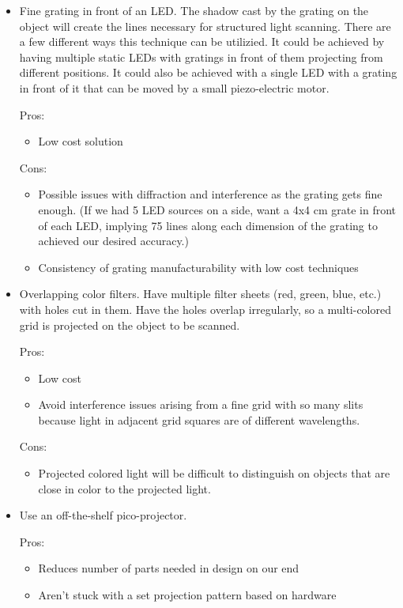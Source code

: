 \documentclass[10pt]{article}
\begin{document}
\begin{itemize}
\item Fine grating in front of an LED. The shadow cast by the grating on the
  object will create the lines necessary for structured light scanning. There are a few different ways this technique can be utilizied. It
  could be achieved by having multiple static LEDs with gratings in front of
  them projecting from different positions.  It could also be achieved with a single LED with a grating in front of it that can be moved by a small piezo-electric motor.
  
  Pros:
  \begin{itemize}
  \item Low cost solution
  \end{itemize}

  Cons:
  \begin{itemize}
  \item Possible issues with diffraction and interference as the grating gets fine enough. (If we had 5 LED sources on a side, want a 4x4 cm grate in front of each LED, implying 75 lines along each dimension of the grating to achieved our desired accuracy.)
  \item Consistency of grating manufacturability with low cost techniques
  \end{itemize}

\item Overlapping color filters. Have multiple filter sheets (red, green, blue, etc.) with holes cut in them. Have the holes overlap irregularly, so a multi-colored grid is projected on the object to be scanned.

Pros:
\begin{itemize}
\item Low cost
\item Avoid interference issues arising from a fine grid with so many slits because light in adjacent grid squares are of different wavelengths.
\end{itemize}

Cons:
\begin{itemize}
\item Projected colored light will be difficult to distinguish on objects that are close in color to the projected light.
\end{itemize}

\item Use an off-the-shelf pico-projector. 

Pros:
\begin{itemize}
\item Reduces number of parts needed in design on our end
\item Aren't stuck with a set projection pattern based on hardware
\end{itemize}


\end{itemize}
\end{document}
